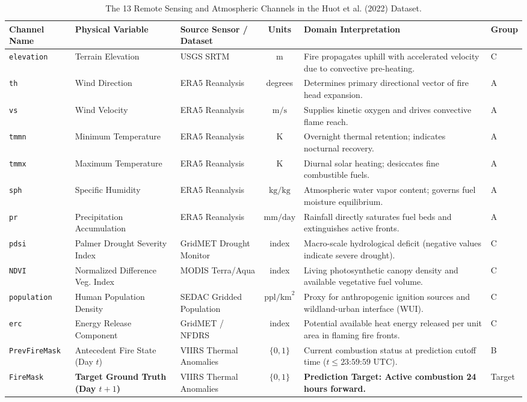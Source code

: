 \documentclass[10pt,journal,compsoc]{IEEEtran}
\begin{document}
\begin{table}[t]
\centering
\caption{The 13 Remote Sensing and Atmospheric Channels in the Huot et al. (2022) Dataset.}
\label{tab:channels}
\begin{tabularx}{\textwidth}{lllcXl}
\toprule
\textbf{Channel Name} & \textbf{Physical Variable} & \textbf{Source Sensor / Dataset} & \textbf{Units} & \textbf{Domain Interpretation} & \textbf{Group} \\
\midrule
\texttt{elevation} & Terrain Elevation & USGS SRTM & $\text{m}$ & Fire propagates uphill with accelerated velocity due to convective pre-heating. & C \\
\texttt{th} & Wind Direction & ERA5 Reanalysis & degrees & Determines primary directional vector of fire head expansion. & A \\
\texttt{vs} & Wind Velocity & ERA5 Reanalysis & $\text{m/s}$ & Supplies kinetic oxygen and drives convective flame reach. & A \\
\texttt{tmmn} & Minimum Temperature & ERA5 Reanalysis & $\text{K}$ & Overnight thermal retention; indicates nocturnal recovery. & A \\
\texttt{tmmx} & Maximum Temperature & ERA5 Reanalysis & $\text{K}$ & Diurnal solar heating; desiccates fine combustible fuels. & A \\
\texttt{sph} & Specific Humidity & ERA5 Reanalysis & $\text{kg/kg}$ & Atmospheric water vapor content; governs fuel moisture equilibrium. & A \\
\texttt{pr} & Precipitation Accumulation & ERA5 Reanalysis & $\text{mm/day}$ & Rainfall directly saturates fuel beds and extinguishes active fronts. & A \\
\texttt{pdsi} & Palmer Drought Severity Index & GridMET Drought Monitor & index & Macro-scale hydrological deficit (negative values indicate severe drought). & C \\
\texttt{NDVI} & Normalized Difference Veg. Index & MODIS Terra/Aqua & index & Living photosynthetic canopy density and available vegetative fuel volume. & C \\
\texttt{population} & Human Population Density & SEDAC Gridded Population & $\text{ppl/km}^2$ & Proxy for anthropogenic ignition sources and wildland-urban interface (WUI). & C \\
\texttt{erc} & Energy Release Component & GridMET / NFDRS & index & Potential available heat energy released per unit area in flaming fire fronts. & C \\
\texttt{PrevFireMask} & Antecedent Fire State (Day $t$) & VIIRS Thermal Anomalies & $\{0, 1\}$ & Current combustion status at prediction cutoff time ($t \le \text{23:59:59 UTC}$). & B \\
\texttt{FireMask} & \textbf{Target Ground Truth (Day $t+1$)} & VIIRS Thermal Anomalies & $\{0, 1\}$ & \textbf{Prediction Target: Active combustion 24 hours forward.} & Target \\
\bottomrule
\end{tabularx}
\end{table}
\end{document}
